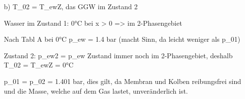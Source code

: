 b) T_02 = T_ewZ, das GGW im Zustand 2

Wasser im Zustand 1: 0°C bei x > 0 => im 2-Phasengebiet

Nach Tabl A bei 0°C p_ew = 1.4 bar (macht Sinn, da leicht weniger als p_01)

Zustand 2: p_ew2 = p_ew Zustand immer noch im 2-Phasengebiet, deshalb T_02 = T_ewZ = 0°C

p_01 = p_02 = 1.401 bar, dies gilt, da Membran und Kolben reibungsfrei sind und die Masse, welche auf dem Gas lastet, unveränderlich ist.
